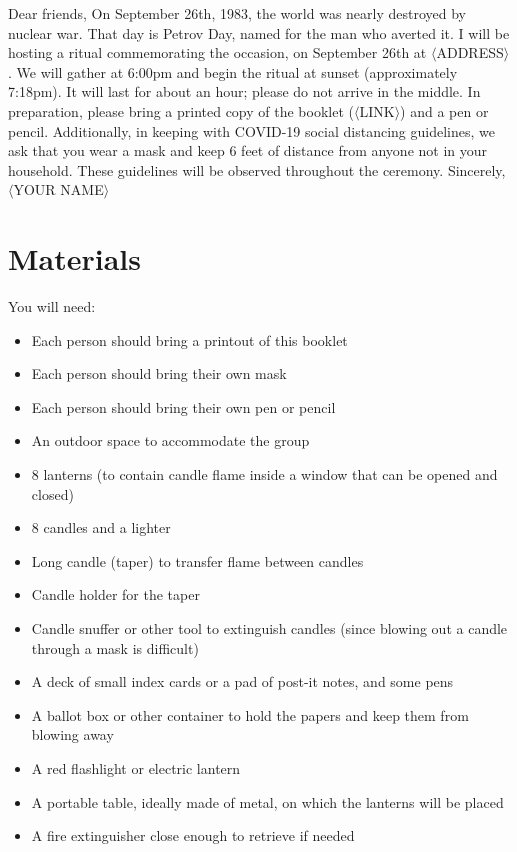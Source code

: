 \documentclass{article}
\begin{document}
\begin{center}
	\parbox{4.5in}{
	Dear friends,\newline\newline
	On September 26th, 1983, the world was nearly destroyed by nuclear war.
	That day is Petrov Day, named for the man who averted it. I will be
	hosting a ritual commemorating the occasion, on September 26th at
	$\langle$ADDRESS$\rangle$. We will gather at 6:00pm and begin the ritual
	at sunset (approximately 7:18pm). It will last for about an hour; please do
	not arrive in the middle.\newline\newline
	In preparation, please bring a printed copy of the booklet
	($\langle$LINK$\rangle$) and a pen or pencil. Additionally, in keeping with
	COVID-19 social distancing guidelines, we ask that you wear a mask and keep
	6 feet of distance from anyone not in your household. These guidelines will
	be observed throughout the ceremony.\newline\newline
	Sincerely,\newline
	$\langle$YOUR NAME$\rangle$}
\end{center}

\section{Materials}
You will need:

\begin{itemize} \itemsep0pt \parskip0pt 
    \item Each person should bring a printout of this booklet
    \item Each person should bring their own mask
    \item Each person should bring their own pen or pencil
    \item An outdoor space to accommodate the group
    \item 8 lanterns (to contain candle flame inside a window that can be opened and closed)
    \item 8 candles and a lighter
    \item Long candle (taper) to transfer flame between candles
    \item Candle holder for the taper
    \item Candle snuffer or other tool to extinguish candles (since blowing out a candle through a mask is difficult)
    \item A deck of small index cards or a pad of post-it notes, and some pens
	\item A ballot box or other container to hold the papers and keep them from
blowing away
	\item A red flashlight or electric lantern
	\item A portable table, ideally made of metal, on which the lanterns will be placed
    \item A fire extinguisher close enough to retrieve if needed
\end{itemize}
\end{document}
